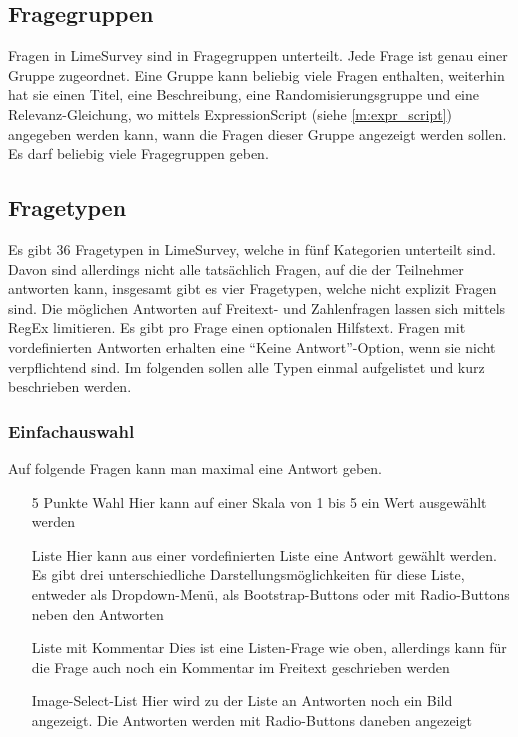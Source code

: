 \subsection{Fragegruppen}


Fragen in LimeSurvey sind in Fragegruppen unterteilt. Jede Frage ist genau einer Gruppe zugeordnet.
Eine Gruppe kann beliebig viele Fragen enthalten, weiterhin hat sie einen Titel, eine Beschreibung, eine Randomisierungsgruppe und eine Relevanz-Gleichung, wo mittels ExpressionScript (siehe \cref{m:expr_script}) angegeben werden kann, wann die Fragen dieser Gruppe angezeigt werden sollen.
Es darf beliebig viele Fragegruppen geben.

\subsection{Fragetypen}


Es gibt 36 Fragetypen in LimeSurvey, welche in fünf Kategorien unterteilt sind.
Davon sind allerdings nicht alle tatsächlich Fragen, auf die der Teilnehmer antworten kann, insgesamt gibt es vier Fragetypen, welche nicht explizit Fragen sind.
Die möglichen Antworten auf Freitext- und Zahlenfragen lassen sich mittels RegEx limitieren.
Es gibt pro Frage einen optionalen Hilfstext.
Fragen mit vordefinierten Antworten erhalten eine \enquote{Keine Antwort}-Option, wenn sie nicht verpflichtend sind.
Im folgenden sollen alle Typen einmal aufgelistet und kurz beschrieben werden.


\subsubsection{Einfachauswahl}

Auf folgende Fragen kann man maximal eine Antwort geben.
\begin{itemize}
	\item[5 Punkte Wahl] Hier kann auf einer Skala von 1 bis 5 ein Wert ausgewählt werden
	\item[Liste] Hier kann aus einer vordefinierten Liste eine Antwort gewählt werden. Es gibt drei unterschiedliche Darstellungsmöglichkeiten für diese Liste, entweder als Dropdown-Menü, als Bootstrap-Buttons oder mit Radio-Buttons neben den Antworten
	\item[Liste mit Kommentar] Dies ist eine Listen-Frage wie oben, allerdings kann für die Frage auch noch ein Kommentar im Freitext geschrieben werden
	\item[Image-Select-List] Hier wird zu der Liste an Antworten noch ein Bild angezeigt. Die Antworten werden mit Radio-Buttons daneben angezeigt
\end{itemize}

